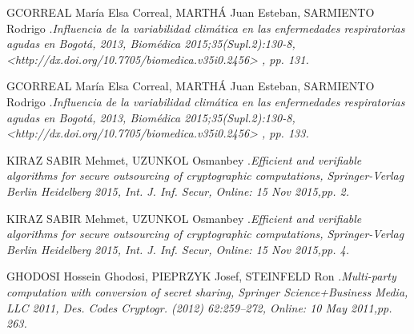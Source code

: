 \documentclass[a4paper, 12pt, oneside]{article}
\theoremstyle{definition}
\theoremstyle{remark}
\begin{document}
\begin{thebibliography}{99}
 GCORREAL María Elsa Correal, MARTHÁ Juan Esteban, SARMIENTO Rodrigo .\emph{Influencia de la variabilidad climática en las enfermedades respiratorias agudas en Bogotá, 2013, Biomédica 2015;35(Supl.2):130-8, <http://dx.doi.org/10.7705/biomedica.v35i0.2456> , pp. 131.}

 GCORREAL María Elsa Correal, MARTHÁ Juan Esteban, SARMIENTO Rodrigo .\emph{Influencia de la variabilidad climática en las enfermedades respiratorias agudas en Bogotá, 2013, Biomédica 2015;35(Supl.2):130-8, <http://dx.doi.org/10.7705/biomedica.v35i0.2456> , pp. 133.}

KIRAZ SABIR Mehmet, UZUNKOL Osmanbey .\emph{Efficient and verifiable algorithms for secure outsourcing of cryptographic computations, Springer-Verlag Berlin Heidelberg 2015, Int. J. Inf. Secur, Online: 15 Nov 2015,pp. 2.}

KIRAZ SABIR Mehmet, UZUNKOL Osmanbey .\emph{Efficient and verifiable algorithms for secure outsourcing of cryptographic computations, Springer-Verlag Berlin Heidelberg 2015, Int. J. Inf. Secur, Online: 15 Nov 2015,pp. 4.}

GHODOSI Hossein Ghodosi, PIEPRZYK Josef, STEINFELD Ron .\emph{Multi-party computation with conversion of secret sharing, Springer Science+Business Media, LLC 2011, Des. Codes Cryptogr. (2012) 62:259–272, Online: 10 May 2011,pp. 263.}

\end{thebibliography}
\end{document}
